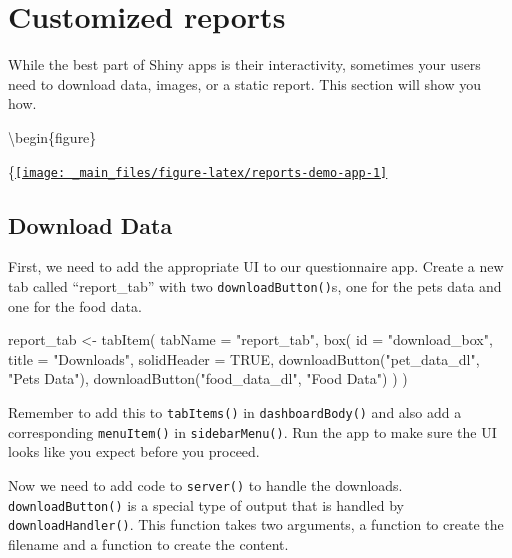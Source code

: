 \documentclass[
]{book}
\newenvironment{Shaded}{\begin{snugshade}}{\end{snugshade}}
\newcommand{\AttributeTok}[1]{\textcolor[rgb]{0.77,0.63,0.00}{#1}}
\newcommand{\ConstantTok}[1]{\textcolor[rgb]{0.00,0.00,0.00}{#1}}
\newcommand{\FunctionTok}[1]{\textcolor[rgb]{0.00,0.00,0.00}{#1}}
\newcommand{\NormalTok}[1]{#1}
\newcommand{\OtherTok}[1]{\textcolor[rgb]{0.56,0.35,0.01}{#1}}
\newcommand{\StringTok}[1]{\textcolor[rgb]{0.31,0.60,0.02}{#1}}
\begin{document}
\hypertarget{reports}{%
\chapter{Customized reports}\label{reports}}

While the best part of Shiny apps is their interactivity, sometimes your users need to download data, images, or a static report. This section will show you how.

\textbackslash begin\{figure\}

\{\centering \href{https://shiny.psy.gla.ac.uk/debruine/reports_demo/}{\texttt{[image: \_main\_files/figure-latex/reports-demo-app-1]} }

\hypertarget{download-data}{%
\section{Download Data}\label{download-data}}

First, we need to add the appropriate UI to our questionnaire app. Create a new tab called ``report\_tab'' with two \texttt{downloadButton()}s, one for the pets data and one for the food data.

\begin{Shaded}
\begin{Highlighting}[]
\NormalTok{report\_tab }\OtherTok{\textless{}{-}} \FunctionTok{tabItem}\NormalTok{(}
  \AttributeTok{tabName =} \StringTok{"report\_tab"}\NormalTok{,}
  \FunctionTok{box}\NormalTok{(}
    \AttributeTok{id =} \StringTok{"download\_box"}\NormalTok{,}
    \AttributeTok{title =} \StringTok{"Downloads"}\NormalTok{,}
    \AttributeTok{solidHeader =} \ConstantTok{TRUE}\NormalTok{,}
    \FunctionTok{downloadButton}\NormalTok{(}\StringTok{"pet\_data\_dl"}\NormalTok{, }\StringTok{"Pets Data"}\NormalTok{),}
    \FunctionTok{downloadButton}\NormalTok{(}\StringTok{"food\_data\_dl"}\NormalTok{, }\StringTok{"Food Data"}\NormalTok{)}
\NormalTok{  )}
\NormalTok{)}
\end{Highlighting}
\end{Shaded}

Remember to add this to \texttt{tabItems()} in \texttt{dashboardBody()} and also add a corresponding \texttt{menuItem()} in \texttt{sidebarMenu()}. Run the app to make sure the UI looks like you expect before you proceed.

Now we need to add code to \texttt{server()} to handle the downloads. \texttt{downloadButton()} is a special type of output that is handled by \texttt{downloadHandler()}. This function takes two arguments, a function to create the filename and a function to create the content.
\end{document}
